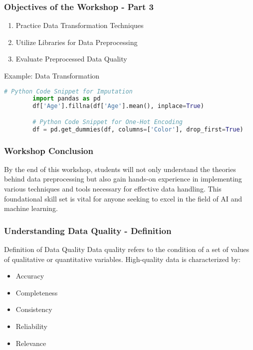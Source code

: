 \documentclass{beamer}
\begin{document}
\begin{frame}[fragile]
    \frametitle{Objectives of the Workshop - Part 3}
    \begin{enumerate}[resume]
        \item Practice Data Transformation Techniques
        \item Utilize Libraries for Data Preprocessing
        \item Evaluate Preprocessed Data Quality
    \end{enumerate}
    
    \begin{block}{Example: Data Transformation}
        \begin{lstlisting}[language=Python]
        # Python Code Snippet for Imputation
        import pandas as pd
        df['Age'].fillna(df['Age'].mean(), inplace=True)

        # Python Code Snippet for One-Hot Encoding
        df = pd.get_dummies(df, columns=['Color'], drop_first=True)
        \end{lstlisting}    
    \end{block}
\end{frame}

\begin{frame}[fragile]
    \frametitle{Workshop Conclusion}
    By the end of this workshop, students will not only understand the theories behind data preprocessing but also gain hands-on experience in implementing various techniques and tools necessary for effective data handling. This foundational skill set is vital for anyone seeking to excel in the field of AI and machine learning.
\end{frame}

\begin{frame}[fragile]
    \frametitle{Understanding Data Quality - Definition}
    \begin{block}{Definition of Data Quality}
        Data quality refers to the condition of a set of values of qualitative or quantitative variables. 
        High-quality data is characterized by:
        \begin{itemize}
            \item Accuracy
            \item Completeness
            \item Consistency
            \item Reliability
            \item Relevance
        \end{itemize}
    \end{block}
\end{frame}
\end{document}

